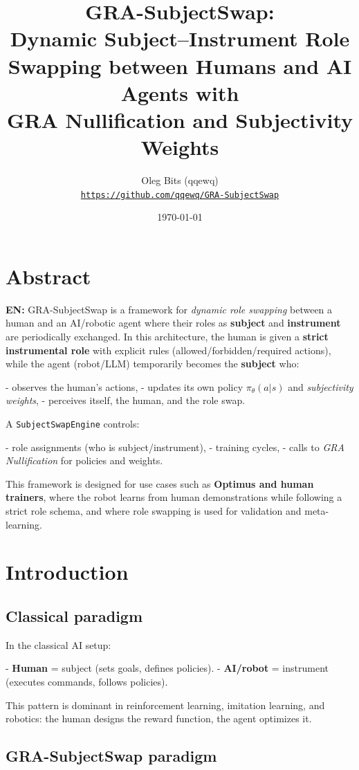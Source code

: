 \documentclass[11pt,a4paper]{article}
\title{
    \textbf{GRA-SubjectSwap:}\\
    Dynamic Subject–Instrument Role Swapping between Humans and AI Agents with\\
    GRA Nullification and Subjectivity Weights
}
\author{
    Oleg Bits (qqewq)\\
    \href{https://github.com/qqewq/GRA-SubjectSwap}{\texttt{https://github.com/qqewq/GRA-SubjectSwap}}
}
\date{\today}
\begin{document}
\maketitle

\tableofcontents
\section*{Abstract}

\textbf{EN:}  
GRA-SubjectSwap is a framework for \textit{dynamic role swapping} between a human and an AI/robotic agent where their roles as \textbf{subject} and \textbf{instrument} are periodically exchanged.  
In this architecture, the human is given a \textbf{strict instrumental role} with explicit rules (allowed/forbidden/required actions), while the agent (robot/LLM) temporarily becomes the \textbf{subject} who:

- observes the human's actions,
- updates its own policy \(\pi_\theta(a|s)\) and \textit{subjectivity weights},
- perceives itself, the human, and the role swap.

A \texttt{SubjectSwapEngine} controls:

- role assignments (who is subject/instrument),
- training cycles,
- calls to \textit{GRA Nullification} for policies and weights.

This framework is designed for use cases such as \textbf{Optimus and human trainers}, where the robot learns from human demonstrations while following a strict role schema, and where role swapping is used for validation and meta-learning.

\section{Introduction}

\subsection{Classical paradigm}

In the classical AI setup:

- \textbf{Human} = subject (sets goals, defines policies).
- \textbf{AI/robot} = instrument (executes commands, follows policies).

This pattern is dominant in reinforcement learning, imitation learning, and robotics: the human designs the reward function, the agent optimizes it.

\subsection{GRA-SubjectSwap paradigm}
\end{document}
